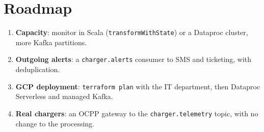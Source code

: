 \documentclass[11pt, a4paper, oneside, headings=normal, numbers=noenddot, DIV=12]{scrartcl}
\begin{document}
\section{Roadmap}
\begin{enumerate}[leftmargin=1.4em]
  \item \textbf{Capacity}: monitor in Scala (\texttt{transformWithState}) or a Dataproc cluster, more Kafka partitions.
  \item \textbf{Outgoing alerts}: a \texttt{charger.alerts} consumer to SMS and ticketing, with deduplication.
  \item \textbf{GCP deployment}: \texttt{terraform plan} with the IT department, then Dataproc Serverless and managed Kafka.
  \item \textbf{Real chargers}: an OCPP gateway to the \texttt{charger.telemetry} topic, with no change to the processing.
\end{enumerate}
\end{document}
